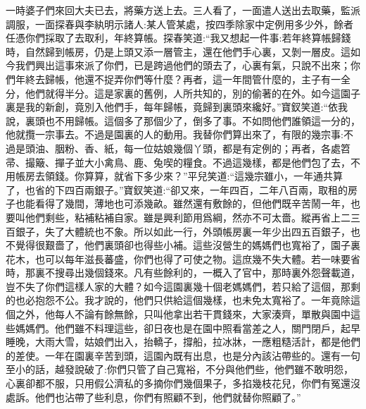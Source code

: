 \begin{parag}
    一時婆子們來回大夫已去，將藥方送上去。三人看了，一面遣人送出去取藥，監派調服，一面探春與李紈明示諸人:某人管某處，按四季除家中定例用多少外，餘者任憑你們採取了去取利，年終算帳。探春笑道:“我又想起一件事:若年終算帳歸錢時，自然歸到帳房，仍是上頭又添一層管主，還在他們手心裏，又剝一層皮。這如今我們興出這事來派了你們，已是跨過他們的頭去了，心裏有氣，只說不出來；你們年終去歸帳，他還不捉弄你們等什麼？再者，這一年間管什麼的，主子有一全分，他們就得半分。這是家裏的舊例，人所共知的，別的偷著的在外。如今這園子裏是我的新創，竟別入他們手，每年歸帳，竟歸到裏頭來纔好。”寶釵笑道:“依我說，裏頭也不用歸帳。這個多了那個少了，倒多了事。不如問他們誰領這一分的，他就攬一宗事去。不過是園裏的人的動用。我替你們算出來了，有限的幾宗事:不過是頭油、胭粉、香、紙，每一位姑娘幾個丫頭，都是有定例的；再者，各處笤帚、撮簸、撣子並大小禽鳥、鹿、兔喫的糧食。不過這幾樣，都是他們包了去，不用帳房去領錢。你算算，就省下多少來？”平兒笑道:“這幾宗雖小，一年通共算了，也省的下四百兩銀子。”寶釵笑道:“卻又來，一年四百，二年八百兩，取租的房子也能看得了幾間，薄地也可添幾畝。雖然還有敷餘的，但他們既辛苦鬧一年，也要叫他們剩些，粘補粘補自家。雖是興利節用爲綱，然亦不可太嗇。縱再省上二三百銀子，失了大體統也不象。所以如此一行，外頭帳房裏一年少出四五百銀子，也不覺得很艱嗇了，他們裏頭卻也得些小補。這些沒營生的媽媽們也寬裕了，園子裏花木，也可以每年滋長蕃盛，你們也得了可使之物。這庶幾不失大體。若一味要省時，那裏不搜尋出幾個錢來。凡有些餘利的，一概入了官中，那時裏外怨聲載道，豈不失了你們這樣人家的大體？如今這園裏幾十個老媽媽們，若只給了這個，那剩的也必抱怨不公。我才說的，他們只供給這個幾樣，也未免太寬裕了。一年竟除這個之外，他每人不論有餘無餘，只叫他拿出若干貫錢來，大家湊齊，單散與園中這些媽媽們。他們雖不料理這些，卻日夜也是在園中照看當差之人，關門閉戶，起早睡晚，大雨大雪，姑娘們出入，抬轎子，撐船，拉冰牀，一應粗糙活計，都是他們的差使。一年在園裏辛苦到頭，這園內既有出息，也是分內該沾帶些的。還有一句至小的話，越發說破了:你們只管了自己寬裕，不分與他們些，他們雖不敢明怨，心裏卻都不服，只用假公濟私的多摘你們幾個果子，多掐幾枝花兒，你們有冤還沒處訴。他們也沾帶了些利息，你們有照顧不到，他們就替你照顧了。”
\end{parag}



